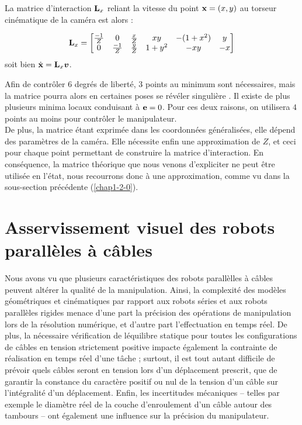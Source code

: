 La matrice d'interaction ${\bf L}_x$ reliant la vitesse du point ${\bf x} = 
(x,y)$ au torseur cin\'ematique de la cam\'era est alors :

\begin{equation}
{\bf L}_x =
\begin{bmatrix}
\frac {-1} Z & 0 & \frac x Z & xy & -(1+x^2) & y \\
0 & \frac {-1} Z & \frac y Z & 1+y^2 & -xy & -x
\end{bmatrix}
\label{chap01:eq23}
\end{equation}
soit bien $\dot {\bf x} = {\bf L}_x \hbox{\boldmath $v$}$.

Afin de contr\^oler $6$ degr\'es de libert\'e, $3$ points au minimum sont 
n\'ecessaires, mais la matrice pourra alors en certaines poses se r\'ev\'eler 
singuli\`ere \cite{michel1993}. Il existe de plus plusieurs minima locaux 
conduisant \`a ${\bf e} = 0$. Pour ces deux raisons, on utilisera $4$ points au 
moins pour contr\^oler le manipulateur.\\

De plus, la matrice \'etant exprim\'ee dans les coordonn\'ees 
g\'en\'eralis\'ees, elle d\'epend des param\`etres de la cam\'era. Elle 
n\'ecessite enfin une approximation de $Z$, et ceci pour chaque point 
permettant de construire la matrice d'interaction. En cons\'equence, la matrice 
th\'eorique que nous venons d'expliciter ne peut \^etre utilis\'ee en l'\'etat, 
nous recourrons donc \`a une approximation, comme vu dans la sous-section 
pr\'ec\'edente (\ref{chap1-2-0}).

\section{Asservissement visuel des robots parallèles à 
câbles}\label{chap1-3}

Nous avons vu que plusieurs caract\'eristiques des robots parall\`elles
\`a c\^ables peuvent alt\'erer la qualit\'e de la manipulation. Ainsi, la
complexit\'e des mod\`eles g\'eom\'etriques et cin\'ematiques par rapport aux
robots s\'eries et aux robots parall\`eles rigides menace d'une part la
pr\'ecision des op\'erations de manipulation lors de la r\'esolution
num\'erique, et d'autre part l'effectuation en temps r\'eel. De plus, la
n\'ecessaire v\'erification de l\'equilibre statique pour toutes les
configurations de c\^ables en tension strictement positive impacte \'egalement
la contrainte de r\'ealisation en temps r\'eel d'une t\^ache ; surtout, il est
tout autant difficile de pr\'evoir quels c\^ables seront en tension lors d'un
d\'eplacement prescrit, que de garantir la constance du caract\`ere positif ou
nul de la tension d'un c\^able sur l'int\'egralit\'e d'un d\'eplacement. Enfin,
les incertitudes m\'ecaniques -- telles par exemple le diam\`etre r\'eel de la
couche d'enroulement d'un c\^able autour des tambours -- ont \'egalement une
influence sur la pr\'ecision du manipulateur.

